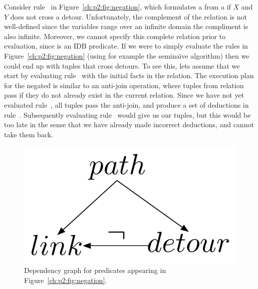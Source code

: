 Consider rule~ in Figure~\ref{ch:p2:fig:negation}, which formulates a
 from a  if $X$ and $Y$ does not cross a detour.
Unfortunately, the complement of the  relation is not well-defined
since the variables range over an infinite domain the compliment is also
infinite.  Moreover, we cannot specify this complete relation prior to
evaluation, since  is an IDB predicate.  If we were to simply
evaluate the rules in Figure~\ref{ch:p2:fig:negation} (using for example the
semina\"{\i}ve algorithm) then we could end up with  tuples that cross
detours.  To see this, lets assume that we start by evaluating rule~
with the initial facts in the  relation.  The execution plan for the
negated  is similar to an anti-join operation, where tuples from
 relation pass if they do not already exist in the current 
relation.  Since we have not yet evaluated rule~, all  tuples
pass the anti-join, and produce a set of  deductions in rule~.
Subsequently evaluating rule~ would give us our  tuples, but
this would be too late in the sense that we have already made incorrect
deductions, and cannot take them back.

\begin{figure} 
\ssp
\begin{center}
\includegraphics[scale=0.75]{figures/dependency-graph}
\caption{\label{ch:p2:fig:dependency}Dependency graph for predicates 
appearing in Figure~\ref{ch:p2:fig:negation}.}
\end{center} 
\end{figure}

